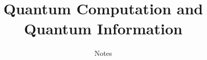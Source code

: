 \title{Quantum Computation and Quantum Information}
\author{Notes}
\date{}


\maketitle
\thispagestyle{empty}
\clearpage
